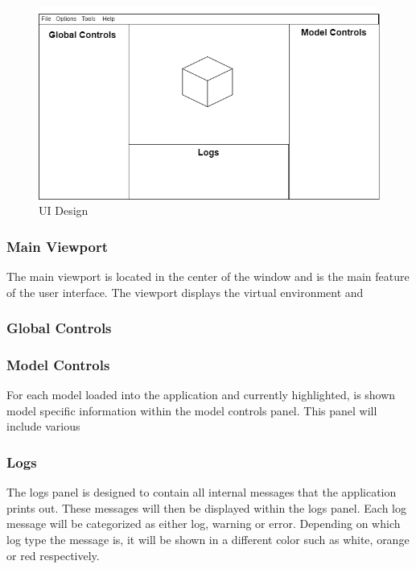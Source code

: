 \documentclass[11pt]{article}
\begin{document}
\begin{figure}[ht]
  \centering
  \includegraphics[width=\textwidth]{images/ui_design.png}
  \caption{UI Design}
  \label{fig:ui_design}
\end{figure}

\subsubsection{Main Viewport}
The main viewport is located in the center of the window and is the main feature
of the user interface. The viewport displays the virtual environment and 

\subsubsection{Global Controls}

\subsubsection{Model Controls}

For each model loaded into the application and currently highlighted, is shown
model specific information within the model controls panel. This panel will include various 


\subsubsection{Logs}
The logs panel is designed to contain all internal messages that the application
prints out. These messages will then be displayed within the logs panel. Each
log message will be categorized as either log, warning or error. Depending on
which log type the message is, it will be shown in a different color such as
white, orange or red respectively.
\end{document}
